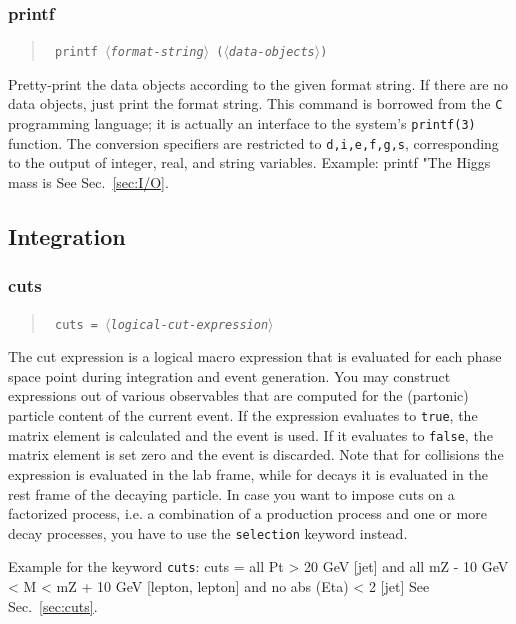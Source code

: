 \documentclass[12pt]{book}
\newenvironment{code}%
  {\begingroup\footnotesize
   \quote
   \verbatim}%
  {\endverbatim
   \endquote
   \endgroup\noindent}
\newenvironment{syntax}%
  {\begin{quote}
   \begin{flushleft}\tt}%
  {\end{flushleft}
   \end{quote}}
\newcommand{\var}[1]{$\langle$\textit{#1}$\rangle$}
\newcommand{\ttt}[1]{\texttt{#1}}
\begin{document}
\subsubsection{printf}
\begin{syntax}
printf \var{format-string} (\var{data-objects})
\end{syntax}
Pretty-print the data objects according to the given format string.
If there are no data objects, just print the format string.
This command is borrowed from the \ttt{C} programming language; it is
actually an interface to the system's \ttt{printf(3)} function.  The
conversion specifiers are restricted to \ttt{d,i,e,f,g,s},
corresponding to the output of integer, real, and string variables.
Example:
\begin{code}
printf "The Higgs mass is %
\end{code}
See Sec.~\ref{sec:I/O}.


\subsection{Integration}

\subsubsection{cuts}
\begin{syntax}
cuts = \var{logical-cut-expression}
\end{syntax}
The cut expression is a logical macro expression that is evaluated for each
phase space point during integration and event generation.  You may construct
expressions out of various observables that are computed for the (partonic)
particle content of the current event.  If the expression evaluates to
\verb|true|, the matrix element is calculated and the event is used.  If it
evaluates to \verb|false|, the matrix element is set zero and the event is
discarded. Note that for collisions the expression is evaluated in the
lab frame, while for decays it is evaluated in the rest frame of the
decaying particle.  In case you want to impose cuts on a factorized
process, i.e. a combination of a production process and one or more
decay processes, you have to use the \texttt{selection} keyword
instead.  

Example for the keyword \texttt{cuts}:
\begin{code}
cuts = all Pt > 20 GeV [jet]
  and  all mZ - 10 GeV < M < mZ + 10 GeV [lepton, lepton]
  and  no  abs (Eta) < 2 [jet]
\end{code}
See Sec.~\ref{sec:cuts}.
\end{document}
